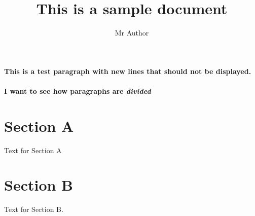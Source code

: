 \documentclass[11pt]{report}
\title{This is a sample document}
\author{Mr Author}
\begin{document}
\maketitle

\paragraph{This is a test paragraph
with new lines that should not be
displayed. }


\paragraph{I want to see how paragraphs are {\em divided}}
\section{Section A}
Text for Section A
\section{Section B}
Text for Section B. 

\end{document}
